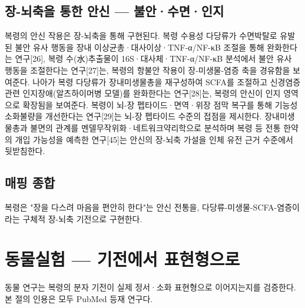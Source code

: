 \documentclass[11pt,oneside]{book}
\begin{document}
\subsection{장-뇌축을 통한 안신 — 불안·수면·인지}
복령의 안신 작용은 장-뇌축을 통해 구현된다. 복령 수용성 다당류가 수면박탈로 유발된 불안 유사 행동을 장내 이상균총·대사이상·TNF-α/NF-κB 조절을 통해 완화한다는 연구[26], 복령 수(水)추출물이 16S·대사체·TNF-α/NF-κB 분석에서 불안 유사 행동을 조절한다는 연구[27]는, 복령의 항불안 작용이 장-미생물-염증 축을 경유함을 보여준다. 나아가 복령 다당류가 장내미생물총을 재구성하여 SCFA를 조절하고 신경염증 관련 인지장애(알츠하이머병 모델)를 완화한다는 연구[28]는, 복령의 안신이 인지 영역으로 확장됨을 보여준다. 복령이 뇌-장 펩타이드·면역·위장 점막 복구를 통해 기능성소화불량을 개선한다는 연구[29]는 뇌-장 펩타이드 수준의 접점을 제시한다. 장내미생물총과 불면의 관계를 멘델무작위화·네트워크약리학으로 분석하며 복령 등 전통 한약의 개입 가능성을 예측한 연구[45]는 안신의 장-뇌축 가설을 인체 유전 근거 수준에서 뒷받침한다.

\subsection{매핑 종합}
\vspace{2pt}\vspace{3pt}

복령은 "장을 다스려 마음을 편안히 한다"는 안신 전통을, 다당류-미생물-SCFA-염증이라는 구체적 장-뇌축 기전으로 구현한다.

\section{동물실험 — 기전에서 표현형으로}
동물 연구는 복령의 분자 기전이 실제 정서·소화 표현형으로 이어지는지를 검증한다. 본 절의 인용은 모두 PubMed 등재 연구다.
\end{document}
